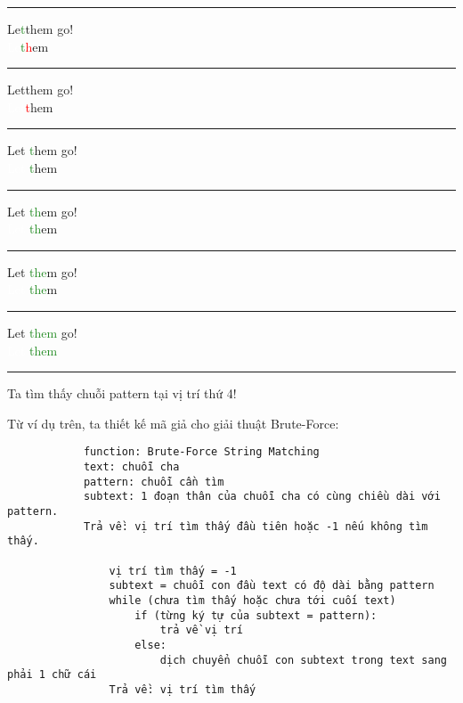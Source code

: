 \documentclass[a4paper,11pt]{article}
\begin{document}
			\vspace*{2mm}
			\hrule
			Le\textcolor{ForestGreen}{t}\textcolor{red}{\textvisiblespace}them go!\\
			\textcolor{white}{Le}\textcolor{ForestGreen}{t}\textcolor{red}{h}em

			\vspace*{2mm}
			\hrule
			Let\textcolor{red}{\textvisiblespace}them go!\\
			\textcolor{white}{Let}\textcolor{red}{t}hem
			
			\vspace*{2mm}
			\hrule
			Let \textcolor{ForestGreen}{t}hem go!\\
			\textcolor{white}{Let }\textcolor{ForestGreen}{t}hem

			\vspace*{2mm}
			\hrule
			Let \textcolor{ForestGreen}{th}em go!\\
			\textcolor{white}{Let }\textcolor{ForestGreen}{th}em
			
			\vspace*{2mm}
			\hrule
			Let \textcolor{ForestGreen}{the}m go!\\
			\textcolor{white}{Let }\textcolor{ForestGreen}{the}m
						
			\vspace*{2mm}
			\hrule
			Let \textcolor{ForestGreen}{them} go!\\
			\textcolor{white}{Let }\textcolor{ForestGreen}{them}
			\vspace*{2mm}
			\hrule

			Ta tìm thấy chuỗi pattern tại vị trí thứ 4!
			
			\vspace*{4mm}
			
			Từ ví dụ trên, ta thiết kế mã giả cho giải thuật Brute-Force:

			\begin{lstlisting}
			function: Brute-Force String Matching
			text: chuỗi cha 
			pattern: chuỗi cần tìm 
			subtext: 1 đoạn thân của chuỗi cha có cùng chiều dài với pattern.
			Trả về: vị trí tìm thấy đầu tiên hoặc -1 nếu không tìm thấy.
			
				vị trí tìm thấy = -1
				subtext = chuỗi con đầu text có độ dài bằng pattern
				while (chưa tìm thấy hoặc chưa tới cuối text)
					if (từng ký tự của subtext = pattern):
						trả về vị trí
					else:
						dịch chuyển chuỗi con subtext trong text sang phải 1 chữ cái
				Trả về: vị trí tìm thấy
					\end{lstlisting}
			
\end{document}
